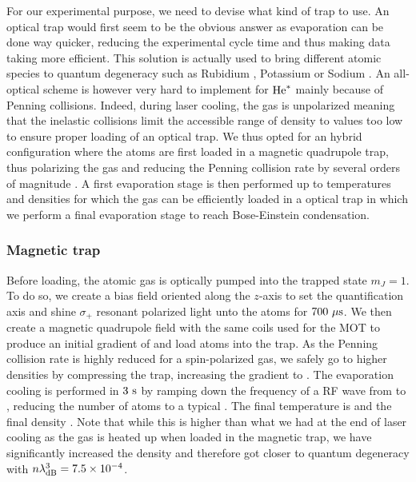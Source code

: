 For our experimental purpose, we need to devise what kind of trap to use. An optical trap would first seem to be the obvious answer as evaporation can be done way quicker, reducing the experimental cycle time and thus making data taking more efficient. This solution is actually used to bring different atomic species to quantum degeneracy such as Rubidium \cite{barrett2001all}, Potassium \cite{salomon2014all} or Sodium \cite{jacob2011production}. An all-optical scheme is however very hard to implement for $\mathrm{He}^*$ mainly because of Penning collisions. Indeed, during laser cooling, the gas is unpolarized meaning that the inelastic collisions limit the accessible range of density to values too low to ensure proper loading of an optical trap.  We thus opted for an hybrid configuration where the atoms are first loaded in a magnetic quadrupole trap, thus polarizing the gas and reducing the Penning collision rate by several orders of magnitude \cite{shlyapnikov1994decay}. A first evaporation stage is then performed up to temperatures and densities for which the gas can be efficiently loaded in a optical trap in which we perform a final evaporation stage to reach Bose-Einstein condensation.

\subsubsection{Magnetic trap}

Before loading, the atomic gas is optically pumped into the trapped state $m_J=1$. To do so, we create a bias field oriented along the $z$-axis to set the quantification axis and shine $\sigma_{+}$ resonant polarized light unto the atoms for $700 \ \mu \rm{s}$. We then create a magnetic quadrupole field with the same coils used for the MOT to produce an initial gradient of  and load  atoms into the trap. As the Penning collision rate is highly reduced for a spin-polarized gas, we safely go to higher densities by compressing the trap, increasing the gradient to . The evaporation cooling is performed in $3 \ \rm{s}$ by ramping down the frequency of a RF wave from  to , reducing the number of atoms to a typical . The final temperature is  and the final density . Note that while this is higher than what we had at the end of laser cooling as the gas is heated up when loaded in the magnetic trap, we have significantly increased the density and therefore got closer to quantum degeneracy with $n \lambda_{\rm{dB}}^3=7.5 \times 10^{-4}$.

